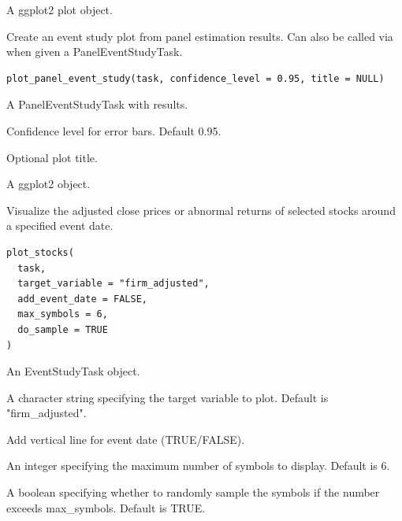 \documentclass[a4paper]{book}
\begin{document}
%
\begin{Value}
A ggplot2 plot object.
\end{Value}
%
\begin{Description}
Create an event study plot from panel estimation results. Can also be
called via  when given a PanelEventStudyTask.
\end{Description}
%
\begin{Usage}
\begin{verbatim}
plot_panel_event_study(task, confidence_level = 0.95, title = NULL)
\end{verbatim}
\end{Usage}
%
\begin{Arguments}
\begin{ldescription}
\item[\code{task}] A PanelEventStudyTask with results.

\item[\code{confidence\_level}] Confidence level for error bars. Default 0.95.

\item[\code{title}] Optional plot title.
\end{ldescription}
\end{Arguments}
%
\begin{Value}
A ggplot2 object.
\end{Value}
%
\begin{Description}
Visualize the adjusted close prices or abnormal returns of selected stocks
around a specified event date.
\end{Description}
%
\begin{Usage}
\begin{verbatim}
plot_stocks(
  task,
  target_variable = "firm_adjusted",
  add_event_date = FALSE,
  max_symbols = 6,
  do_sample = TRUE
)
\end{verbatim}
\end{Usage}
%
\begin{Arguments}
\begin{ldescription}
\item[\code{task}] An EventStudyTask object.

\item[\code{target\_variable}] A character string specifying the target variable
to plot. Default is "firm\_adjusted".

\item[\code{add\_event\_date}] Add vertical line for event date (TRUE/FALSE).

\item[\code{max\_symbols}] An integer specifying the maximum number of symbols
to display. Default is 6.

\item[\code{do\_sample}] A boolean specifying whether to randomly sample the
symbols if the number exceeds max\_symbols. Default is TRUE.
\end{ldescription}
\end{Arguments}
\end{document}
